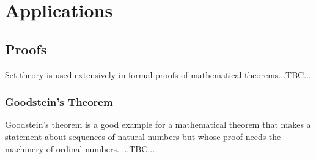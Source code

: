 


\section{Applications}

\subsection{Proofs}
Set theory is used extensively in formal proofs of mathematical theorems...TBC...

\subsubsection{Goodstein's Theorem}
Goodstein's theorem is a good example for a mathematical theorem that makes a statement about sequences of natural numbers but whose proof needs the machinery of ordinal numbers. ...TBC...


